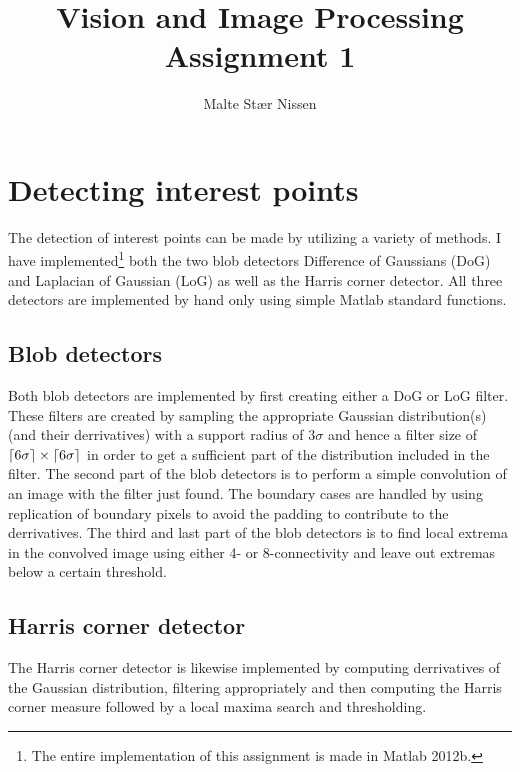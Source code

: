 \documentclass[11pt,a4paper]{article}
\title{Vision and Image Processing\\Assignment 1}
\author{Malte Stær Nissen}
\DeclarePairedDelimiter{\ceil}{\lceil}{\rceil}
\begin{document}
\maketitle

\section{Detecting interest points}

The detection of interest points can be made by utilizing a variety of methods. I
have implemented\footnote{The entire implementation of this assignment is made
in Matlab 2012b.} both the two blob detectors Difference of Gaussians (DoG) and
Laplacian of Gaussian (LoG) as well as the Harris corner detector. All three detectors
are implemented by hand only using simple Matlab standard functions.

\subsection{Blob detectors}

Both blob detectors are implemented by first creating either a DoG or LoG
filter. These filters are created by sampling the appropriate Gaussian
distribution(s) (and their derrivatives) with a support radius of $3\sigma$
and hence a filter size of $\ceil{6 \sigma} \times \ceil{6\sigma}$ in order to
get a sufficient part of the distribution included in the filter. The second
part of the blob detectors is to perform a simple convolution of an image with
the filter just found. The boundary cases are handled by using replication of
boundary pixels to avoid the padding to contribute to the derrivatives. The
third and last part of the blob detectors is to find local extrema in
the convolved image using either 4- or 8-connectivity and leave out extremas
below a certain threshold.

\subsection{Harris corner detector}
The Harris corner detector is likewise implemented by computing derrivatives of
the Gaussian distribution, filtering appropriately and then computing the Harris
corner measure followed by a local maxima search and thresholding.
\end{document}
